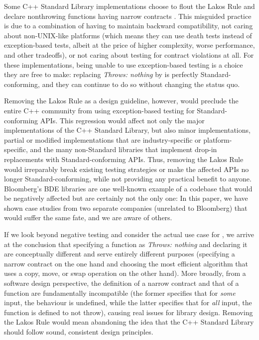 Some C++ Standard Library implementations choose to flout the Lakos Rule and declare nonthrowing functions having narrow contracts . This misguided practice is due to a combination of having to maintain backward compatibility, not caring about non-UNIX-like platforms (which means they can use death tests instead of exception-based tests, albeit at the price of higher complexity, worse performance, and other tradeoffs), or not caring about testing for contract violations at all. For these implementations, being unable to use exception-based testing is a choice they are free to make: replacing \emph{Throws: nothing} by  is perfectly Standard-conforming, and they can continue to do so without changing the status quo.

Removing the Lakos Rule as a design guideline, however, would preclude the entire C++ community from using exception-based testing for Standard-conforming APIs. This regression would affect not only the major implementations of the C++ Standard Library, but also minor implementations, partial or modified implementations that are industry-specific or platform-specific, and the many non-Standard libraries that implement drop-in replacements with Standard-conforming APIs. Thus, removing the Lakos Rule would irreparably break existing testing strategies or make the affected APIs no longer Standard-conforming, while not providing any practical benefit to anyone. Bloomberg's BDE libraries are one well-known example of a codebase that would be negatively affected but are certainly not the only one: In this paper, we have shown case studies from two separate companies (unrelated to Bloomberg) that would suffer the same fate, and we are aware of others.

If we look beyond negative testing and consider the actual use case for , we arrive at the conclusion that specifying a function as \emph{Throws: nothing} and declaring it  are conceptually different and serve entirely different purposes (specifying a narrow contract on the one hand and choosing the most efficient algorithm that uses a copy, move, or swap operation on the other hand). More broadly, from a software design perspective, the definition of a narrow contract and that of a  function are fundamentally incompatible (the former specifies that for \emph{some} input, the behaviour is undefined, while the latter specifies that for \emph{all} input, the function is defined to not throw), causing real issues for library design. Removing the Lakos Rule would mean abandoning the idea that the C++ Standard Library should follow sound, consistent design principles.

